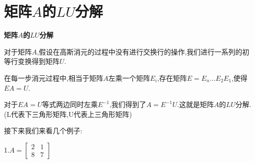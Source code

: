\documentclass[oneside]{book}
\begin{document}
	\chapter{矩阵$A$的$LU$分解}
	\textbf{矩阵$A$的$LU$分解}
	
	对于矩阵$A$,假设在高斯消元的过程中没有进行交换行的操作,我们进行一系列的初等行变换得到矩阵$U$.
	
	在每一步消元过程中,相当于矩阵$A$左乘一个矩阵$E_{i}$,存在矩阵$ E=E_{n}...E_{2}E_{1} $,使得$EA=U$.
	
	对于$ EA=U $等式两边同时左乘$ E^{-1} $,我们得到了$ A=E^{-1}U $.这就是矩阵$A$的$LU$分解.
	(L代表下三角形矩阵,U代表上三角形矩阵)
	
	接下来我们来看几个例子:
	
	1.$ A=\left[\begin{array}{cc}
		2 & 1\\
		8 & 7
	\end{array}\right] $
\end{document}

